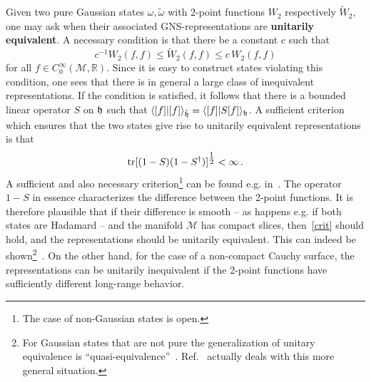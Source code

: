 \documentclass[12pt]{article}
\newcommand{\half}{\tfrac12}
\newcommand{\RR}{\mathbb{R}}
\renewcommand{\half}{\tfrac{1}{2}}
\newcommand{\M}{\mathscr{M}}
\theoremstyle{plain}
\theoremstyle{definition}
\def\ben{\begin{equation}}
\def\een{\end{equation}}
\begin{document}
Given two pure Gaussian states $\omega, \tilde \omega$ with 2-point functions $W_2$ respectively
$\tilde W_2$, one may ask when their associated GNS-representations are
{\bf unitarily equivalent}. A necessary condition is that there be a constant
$c$ such that
\ben
c^{-1} W_2(f, f) \le \tilde W_2(f,f) \le c \, W_2(f, f)
\een
for all $f \in C^\infty_0(\M,\RR)$. Since it is easy to construct states violating this condition, one sees that
there is in general a large class of inequivalent representations. If the condition is
satisfied, it follows that there is a bounded linear
operator $S$ on ${\frak h}$ such that $\langle [f] | [f]
\rangle_{\tilde {\frak h}}
= \langle [f] | S [f] \rangle_{{\frak h}}$. A sufficient criterion
which ensures that the two states give rise to unitarily equivalent representations is that
\ben\label{crit}
{\rm tr} [(1-S)(1-S^\dagger)]^{\half} < \infty \, .
\een
A sufficient and also necessary criterion\footnote{The case of non-Gaussian
states is open.} can be found e.g. in~\cite{araki}. The operator $1-S$ in essence
characterizes the difference between the 2-point functions. It is therefore plausible that
if their difference is smooth -- as happens e.g. if both states
are  Hadamard -- and the manifold $\M$ has compact slices,
then~\eqref{crit} should hold, and the representations should be unitarily
equivalent. This can indeed be shown\footnote{
For Gaussian states that are not pure the generalization of unitary 
equivalence is ``quasi-equivalence''~\cite{araki}. Ref.~\cite{verch}
actually deals with this more general situation.
}~\cite{verch}. On the other hand, for the case of a non-compact
Cauchy surface, the representations can be unitarily
inequivalent if the 2-point functions have sufficiently different long-range behavior.
\end{document}
